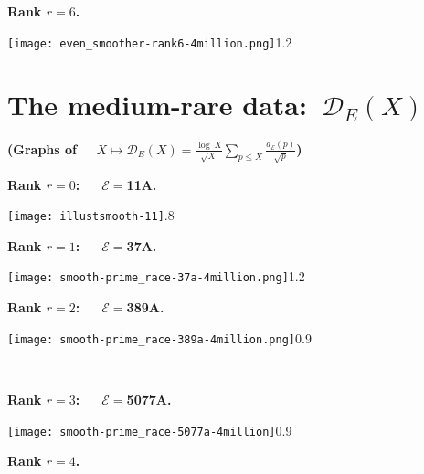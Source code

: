 \documentclass[11pt]{article}
\theoremstyle{plain}
\theoremstyle{definition}
\numberwithin{equation}{section}
\numberwithin{figure}{section}
\numberwithin{table}{section}
\begin{document}
 \vskip40pt






 \newpage

  \centerline{\bf Rank $r=6$.}


 \vskip20pt



     \texttt{[image: even\_smoother-rank6-4million.png]}{1.2}~\label{sr6}
         \section{The medium-rare data:\   ${\mathcal D}_E(X)$}
       \vskip40pt

       \centerline{\bf (Graphs of \ \   $X\mapsto {\mathcal D}_E(X) = {\frac{\log\ X}{\sqrt X}}\sum_{p \le X}{\frac{a_{\mathcal E}(p)}{\sqrt p}}$)}

 \vskip40pt


  \centerline{\bf Rank $r=0$:\ \ \  ${\mathcal E}=$11A.}
   \vskip20pt
   \texttt{[image: illustsmooth-11]}{.8}~\label{s11}
  \

    \newpage

  \centerline{\bf Rank $r=1$:\ \ \  ${\mathcal E}=$37A.}


   \vskip40pt



     \texttt{[image: smooth-prime\_race-37a-4million.png]}{1.2}~\label{s37}
%

   \vskip40pt


  \centerline{\bf Rank $r=2$:\ \ \  ${\mathcal E}=$389A.}


  \vskip20pt


     \texttt{[image: smooth-prime\_race-389a-4million.png]}{0.9}~\label{s389}


\newpage

\
  \centerline{\bf Rank $r=3$:\ \ \  ${\mathcal E}=$5077A.}


 \vskip10pt



     \texttt{[image: smooth-prime\_race-5077a-4million]}{0.9}~\label{s5077}

  \vskip30pt


  \centerline{\bf Rank $r=4$.}


  \vskip10pt
\end{document}
